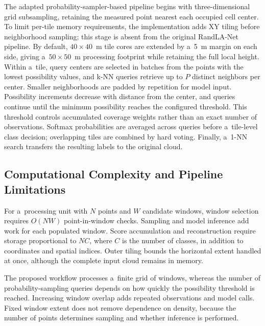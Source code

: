 The adapted probability-sampler-based pipeline begins with three-dimensional grid subsampling, retaining the measured point nearest each occupied cell center. To limit per-tile memory requirements, the implementation adds XY tiling before neighborhood sampling; this stage is absent from the original RandLA-Net pipeline. By default, $40\times40$~m tile cores are extended by a~5~m margin on each side, giving a~$50\times50$~m processing footprint while retaining the full local height. Within a~tile, query centers are selected in batches from the points with the lowest possibility values, and k-NN queries retrieve up to $P$ distinct neighbors per center. Smaller neighborhoods are padded by repetition for model input. Possibility increments decrease with distance from the center, and queries continue until the minimum possibility reaches the configured threshold. This threshold controls accumulated coverage weights rather than an exact number of observations. Softmax probabilities are averaged across queries before a~tile-level class decision; overlapping tiles are combined by hard voting. Finally, a~1-NN search transfers the resulting labels to the original cloud.

\subsection{Computational Complexity and Pipeline Limitations}

For a~processing unit with $N$ points and $W$ candidate windows, window selection requires $O(NW)$ point-in-window checks. Sampling and model inference add work for each populated window. Score accumulation and reconstruction require storage proportional to $NC$, where $C$ is the number of classes, in addition to coordinates and spatial indices. Outer tiling bounds the horizontal extent handled at once, although the complete input cloud remains in memory.

The proposed workflow processes a~finite grid of windows, whereas the number of probability-sampling queries depends on how quickly the possibility threshold is reached. Increasing window overlap adds repeated observations and model calls. Fixed window extent does not remove dependence on density, because the number of points determines sampling and whether inference is performed.
